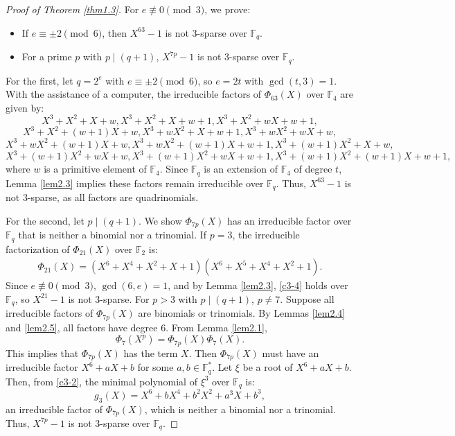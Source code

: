 \documentclass[10pt,reqno]{amsart}
\theoremstyle{definition}
\theoremstyle{remark}
\numberwithin{equation}{section}
\begin{document}
\begin{proof}[Proof of Theorem \ref{thm1.3}]
For $e \not\equiv 0 \pmod{3}$, we prove:
\begin{itemize}
    \item If $e \equiv \pm 2 \pmod{6}$, then $X^{63} - 1$ is not 3-sparse over $\mathbb{F}_q$.
    \item For a prime $p$ with $p \mid (q + 1)$, $X^{7p} - 1$ is not 3-sparse over $\mathbb{F}_q$.
\end{itemize}
For the first, let $q = 2^e$ with $e \equiv \pm 2 \pmod{6}$, so $e = 2t$ with $\gcd(t, 3) = 1$. With the assistance of a computer, the irreducible factors of $\Phi_{63}(X)$ over $\mathbb{F}_4$ are given by:
$$X^3 + X^2 + X + w, X^3 + X^2 + X + w + 1, X^3 + X^2 + w X + w + 1,$$
$$X^3 + X^2 + (w + 1) X + w,  X^3 + w X^2 + X + w + 1,  X^3 + w X^2 + w X + w,$$
$$X^3 + w X^2 + (w + 1) X + w,  X^3 + w X^2 + (w + 1) X + w + 1, X^3 + (w + 1) X^2 + X + w,$$
$$X^3 + (w + 1) X^2 + w X + w,  X^3 + (w + 1) X^2 + w X + w + 1, X^3 + (w + 1) X^2 + (w + 1) X + w + 1,$$
where $w$ is a primitive element of $\mathbb{F}_4$. Since $\mathbb{F}_q$ is an extension of $\mathbb{F}_4$ of degree $t$, Lemma \ref{lem2.3} implies these factors remain irreducible over $\mathbb{F}_q$. Thus, $X^{63} - 1$ is not 3-sparse, as all factors are quadrinomials.

For the second, let $p \mid (q + 1)$. We show $\Phi_{7p}(X)$ has an irreducible factor over $\mathbb{F}_q$ that is neither a binomial nor a trinomial. If $p = 3$, the irreducible factorization of $\Phi_{21}(X)$ over $\mathbb{F}_2$ is:
\begin{align}\label{c3-4}
\Phi_{21}(X) = (X^6 + X^4 + X^2 + X + 1)(X^6 + X^5 + X^4 + X^2 + 1).
\end{align}
Since $e \not\equiv 0 \pmod{3}$, $\gcd(6, e) = 1$, and by Lemma \ref{lem2.3}, \eqref{c3-4} holds over $\mathbb{F}_q$, so $X^{21} - 1$ is not 3-sparse. For $p > 3$ with $p \mid (q + 1)$, $p \neq 7$. Suppose all irreducible factors of $\Phi_{7p}(X)$ are binomials or trinomials. By Lemmas \ref{lem2.4} and \ref{lem2.5}, all factors have degree 6. From Lemma \ref{lem2.1},
$$\Phi_7(X^p) = \Phi_{7p}(X) \Phi_7(X).$$
This implies that $\Phi_{7p}(X)$ has the term $X$. Then $\Phi_{7p}(X)$ must have an irreducible factor $X^6 + a X + b$ for some $a, b \in \mathbb{F}_q^*$. Let $\xi$ be a root of $X^6 + a X + b$. Then, from \eqref{c3-2}, the minimal polynomial of $\xi^3$ over $\mathbb{F}_q$ is:
\[
g_3(X) = X^6 + b X^4 + b^2 X^2 + a^3 X + b^3,
\]
an irreducible factor of $\Phi_{7p}(X)$, which is neither a binomial nor a trinomial. Thus, $X^{7p} - 1$ is not 3-sparse over $\mathbb{F}_q$.


\end{proof}
\end{document}
